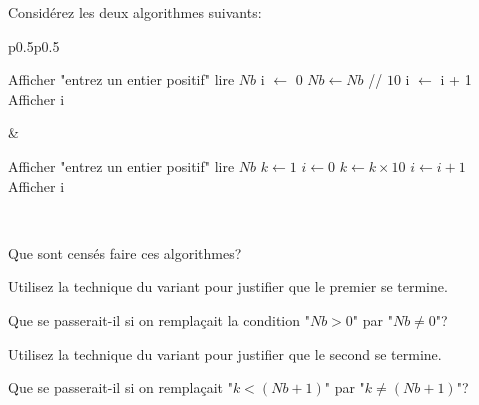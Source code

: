 \documentclass[12pt]{article}
\begin{document}
	\begin{MonExo}
		Considérez les deux algorithmes suivants:
		\vspace{\baselineskip}
		
		\begin{tabular}{p{0.5\textwidth}p{0.5\textwidth}}
			\begin{minipage}{\linewidth}
				\begin{algorithmic}[1]
					\State Afficher "entrez un entier positif"
					\State lire $Nb$
					\State i $\leftarrow$ 0
					\State $Nb \leftarrow Nb$ // $10$
					\State i $\leftarrow$ i + 1
					\EndWhile
					\State Afficher i
				\end{algorithmic}
			\end{minipage}
		&
			\begin{minipage}{\linewidth}
				\begin{algorithmic}[1]
					\State Afficher "entrez un entier positif"
			 		\State lire $Nb$
			 		\State $k \leftarrow 1$
			 		\State $i \leftarrow 0$
			 		\State $k \leftarrow k \times 10$
			 		\State $i \leftarrow i + 1$
			 		\EndWhile
			 		\State Afficher i
			 	\end{algorithmic}
			 \end{minipage}
		\\
		\end{tabular}
		\vspace{\baselineskip}
		
		\begin{alphenum}
			\item Que sont censés faire ces algorithmes?
			\item Utilisez la technique du variant pour justifier que le premier se termine.
			\item Que se passerait-il si on remplaçait la condition "$Nb > 0$" par "$Nb \neq 0$"?
			\item Utilisez la technique du variant pour justifier que le second se termine.
			\item Que se passerait-il si on remplaçait "$k < (Nb + 1)$" par "$k \neq (Nb + 1)$"?
		\end{alphenum}
	\end{MonExo}
\end{document}
